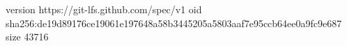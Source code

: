 version https://git-lfs.github.com/spec/v1
oid sha256:de19d89176ce19061e197648a58b3445205a5803aaf7e95ccb64ee0a9fc9e687
size 43716
